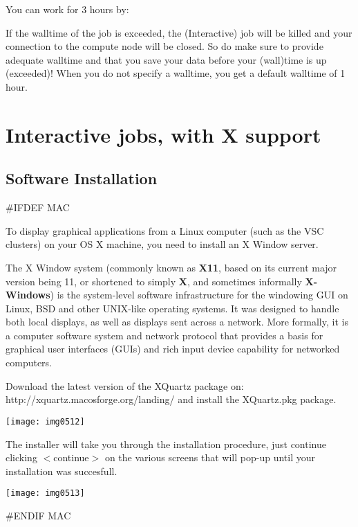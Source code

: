 You can work for 3 hours by:
\begin{prompt}
$ %
\end{prompt}

If the walltime of the job is exceeded, the (Interactive) job will be killed and your connection to the compute node will be closed. So do make sure to provide adequate walltime and that you save your data before your (wall)time is up (exceeded)!  When you do not specify a walltime, you get a default walltime of 1 hour.

\section{Interactive jobs, with X support}

\subsection{Software Installation}

\#IFDEF MAC

To display graphical applications from a Linux computer (such as the VSC clusters) on your OS X machine, you need to install an X Window server.

The X Window system (commonly known as \textbf{X11}, based on its current major version being 11, or shortened to simply \textbf{X}, and sometimes informally \textbf{X-Windows}) is the system-level software infrastructure for the windowing GUI on Linux, BSD and other UNIX-like operating systems. It was designed to handle both local displays, as well as displays sent across a network. More formally, it is a computer software system and network protocol that provides a basis for graphical user interfaces (GUIs) and rich input device capability for networked computers.

Download the latest version of the XQuartz package on:
http://xquartz.macosforge.org/landing/
and install the XQuartz.pkg package.

\texttt{[image: img0512]}

The installer will take you through the installation procedure, just continue clicking $<$continue$>$ on the various screens that will pop-up until your installation was succesfull.

\texttt{[image: img0513]}

\#ENDIF MAC


